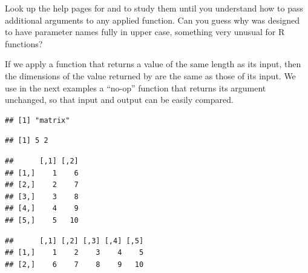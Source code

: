 \documentclass[krantz2]{krantz}\usepackage{knitr}%
\begin{document}
\begin{playground}
Look up the help pages for  and  to study them until you understand how to pass additional arguments to any applied function. Can you guess why  was designed to have parameter names fully in upper case, something very unusual for R functions?
\end{playground}

\begin{warningbox}
If we apply a function that returns a value of the same length as its input, then the dimensions of the value returned by  are the same as those of its input. We use in the next examples a ``no-op'' function that returns its argument unchanged, so that input and output can be easily compared.

\begin{knitrout}\footnotesize
{}\color{fgcolor}\begin{kframe}
\begin{alltt}
\hlstd{(}\hlstd{)}
 \hlkwb{<-} \hlstd{(}\hlopt{:}\hlstd{,}  \hlstd{=} \hlstd{)}
 \hlkwb{<-} \hlstd{(}
 \hlkwb{<-} \hlstd{(}   \hlstd{=} \hlstd{,}  
\end{alltt}
\begin{verbatim}
## [1] "matrix"
\end{verbatim}
\begin{alltt}
\end{alltt}
\begin{verbatim}
## [1] 5 2
\end{verbatim}
\begin{alltt}
\end{alltt}
\begin{verbatim}
##      [,1] [,2]
## [1,]    1    6
## [2,]    2    7
## [3,]    3    8
## [4,]    4    9
## [5,]    5   10
\end{verbatim}
\begin{alltt}
\end{alltt}
\begin{verbatim}
##      [,1] [,2] [,3] [,4] [,5]
## [1,]    1    2    3    4    5
## [2,]    6    7    8    9   10
\end{verbatim}
\end{kframe}
\end{knitrout}


\end{warningbox}
\end{document}
